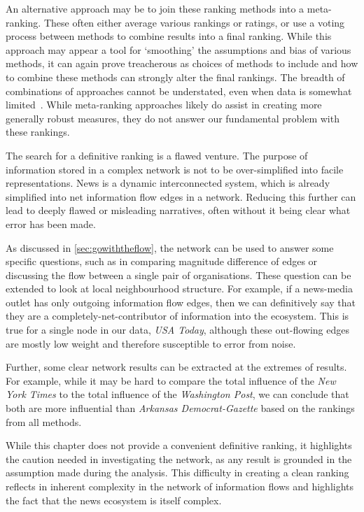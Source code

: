 An alternative approach may be to join these ranking methods into a meta-ranking. These often either average various rankings or ratings, or use a voting process between methods to combine results into a final ranking. While this approach may appear a tool for `smoothing' the assumptions and bias of various methods, it can again prove treacherous as choices of methods to include and how to combine these methods can strongly alter the final rankings. The breadth of combinations of approaches cannot be understated, even when data is somewhat limited~\cite{BarrowRankingRankings2013}. While meta-ranking approaches likely do assist in creating more generally robust measures, they do not answer our fundamental problem with these rankings.

The search for a definitive ranking is a flawed venture. The purpose of information stored in a complex network is not to be over-simplified into facile representations. News is a dynamic interconnected system, which is already simplified into net information flow edges in a network. Reducing this further can lead to deeply flawed or misleading narratives, often without it being clear what error has been made. 

As discussed in \autoref{sec:gowiththeflow}, the network can be used to answer some specific questions, such as in comparing magnitude difference of edges or discussing the flow between a single pair of organisations. These question can be extended to look at local neighbourhood structure. For example, if a news-media outlet has only outgoing information flow edges, then we can definitively say that they are a completely-net-contributor of information into the ecosystem. This is true for a single node in our data, \emph{USA Today}, although these out-flowing edges are mostly low weight and therefore susceptible to error from noise.

Further, some clear network results can be extracted at the extremes of results. For example, while it may be hard to compare the total influence of the \emph{New York Times} to the total influence of the \emph{Washington Post}, we can conclude that both are more influential than \emph{Arkansas Democrat-Gazette} based on the rankings from all methods. 

While this chapter does not provide a convenient definitive ranking, it highlights the caution needed in investigating the network, as any result is grounded in the assumption made during the analysis. This difficulty in creating a clean ranking reflects in inherent complexity in the network of information flows and highlights the fact that the news ecosystem is itself complex. 

